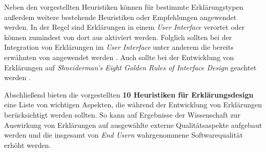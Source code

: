 Neben den vorgestellten Heuristiken können für bestimmte Erklärungstypen außerdem weitere bestehende Heuristiken oder Empfehlungen angewendet werden. In der Regel sind Erklärungen in einem \textit{User Interface} verortet oder können zumindest von dort aus aktiviert werden. Folglich sollten bei der Integration von Erklärungen im \textit{User Interface} unter anderem die bereits erwähnten  von \citeauthor{nielsen10usability} angewendet werden \cite{nielsen10usability}. Auch sollte bei der Entwicklung von Erklärungen auf \textit{Shneiderman’s Eight Golden Rules of Interface Design} geachtet werden \cite{shneiderman2016designing}.

Abschließend bieten die vorgestellten \textbf{10 Heuristiken für Erklärungsdesign} eine Liste von wichtigen Aspekten, die während der Entwicklung von Erklärungen berücksichtigt werden sollten. So kann auf Ergebnisse der Wissenschaft zur Auswirkung von Erklärungen auf ausgewählte externe Qualitätsaspekte aufgebaut werden und die insgesamt von \textit{End Usern} wahrgenommene Softwarequalität erhöht werden.
